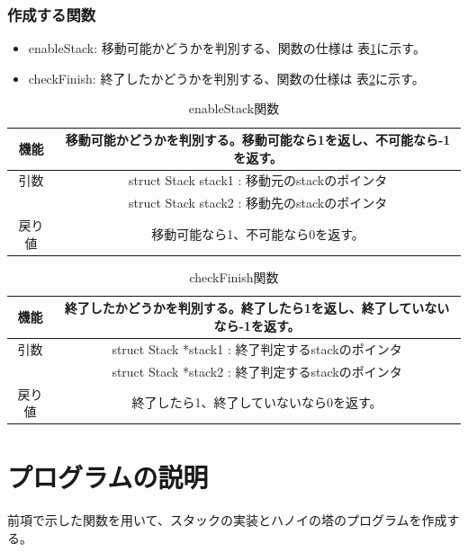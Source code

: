 \documentclass[dvipdfmx]{jsarticle}
\begin{document}
\subsubsection{作成する関数}
\begin{itemize}
  \item enableStack: 移動可能かどうかを判別する、関数の仕様は 表\ref{tab:enablestack_func}に示す。
  \item checkFinish: 終了したかどうかを判別する、関数の仕様は 表\ref{tab:checkfinish_func}に示す。
\end{itemize}
\begin{table}[ht]
  \centering
  \begin{tabular}{|c|c|}
    \hline
    機能  & 移動可能かどうかを判別する。移動可能なら1を返し、不可能なら-1を返す。 \\
    \hline
    引数  & struct Stack stack1 : 移動元のstackのポインタ \\
        & struct Stack stack2 : 移動先のstackのポインタ \\
    \hline
    戻り値 & 移動可能なら1、不可能なら0を返す。                   \\
    \hline
  \end{tabular}
  \caption{enableStack関数}
  \label{tab:enablestack_func}
\end{table}
\begin{table}[ht]
  \centering
  \begin{tabular}{|c|c|}
    \hline
    機能  & 終了したかどうかを判別する。終了したら1を返し、終了していないなら-1を返す。 \\
    \hline
    引数  & struct Stack *stack1 : 終了判定するstackのポインタ \\
        & struct Stack *stack2 : 終了判定するstackのポインタ \\
    \hline
    戻り値 & 終了したら1、終了していないなら0を返す。                   \\
    \hline
  \end{tabular}
  \caption{checkFinish関数}
  \label{tab:checkfinish_func}
\end{table}
\section{プログラムの説明}
前項で示した関数を用いて、スタックの実装とハノイの塔のプログラムを作成する。
\end{document}
